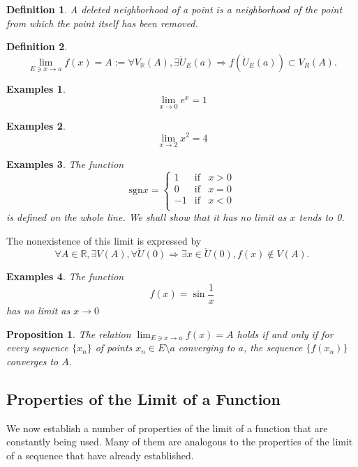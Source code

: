 \documentclass[a4paper,12pt]{article} %
\newtheorem{definition}{Definition}[section]
\newtheorem{proposition}{Proposition}[section]
\newtheorem{example}{Examples}
\begin{document}
\begin{definition}
    A deleted neighborhood of a point is a neighborhood of the point 
    from which the point itself has been removed.
\end{definition}

\begin{definition}
    \[\lim_{E \ni x \to a} f(x) = A := \forall V_{\mathbb{R}}(A), \exists 
    \mathring{U}_E(a) \Rightarrow f\left(\mathring{U}_E(a)\right)
    \subset V_R(A).\]
\end{definition}

\begin{example}
    \[
        \lim_{x \to 0} e^x = 1
        \]
\end{example}
\begin{example}
    \[
        \lim_{x \to 2} x^2 = 4
        \]
\end{example}

\begin{example}
    The function 
    \[
        \mbox{sgn} x = \left\{\begin{array}{rcl} 1 & \mbox{if} & x > 0 \\
                                                0 & \mbox{if} & x = 0 \\
                                               -1 & \mbox{if} & x < 0 \\
                             \end{array} \right.
    \]
is defined on the whole line. We shall show that it has no limit 
as $x$ tends to 0.
\end{example}
The nonexistence of this limit is expressed by 
\[
    \forall A \in \mathbb{R}, \exists V(A), \forall \mathring{U}(0) \Rightarrow 
    \exists x \in \mathring{U}(0), f(x) \notin V(A).
\]

\begin{example}
    The function 
    \[
        f(x) = \sin \frac{1}{x}
    \]
has no limit as $x \to 0$
\end{example}

\begin{proposition}
    The relation $\displaystyle \lim_{E \ni x \to a} f(x) = A$ holds if and 
    only if for every sequence $\{x_n\}$ of points $x_n \in E \setminus a $ 
    converging to $a$, the sequence $\{f(x_n)\}$ converges to $A$.
\end{proposition}

\subsection{Properties of the Limit of a Function}
We now establish a number of properties of the limit of a function 
that are constantly being used. Many of them are analogous to the 
properties of the limit of a sequence that have already established.
\end{document}

